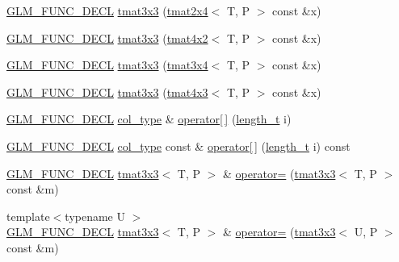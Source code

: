 \begin{DoxyCompactItemize}
\item 
\hyperlink{setup_8hpp_ab2d052de21a70539923e9bcbf6e83a51}{G\+L\+M\+\_\+\+F\+U\+N\+C\+\_\+\+D\+E\+CL} \hyperlink{structglm_1_1detail_1_1tmat3x3_a98fab3111797488d43d13de3b9c34db9}{tmat3x3} (\hyperlink{structglm_1_1detail_1_1tmat2x4}{tmat2x4}$<$ T, P $>$ const \&x)
\item 
\hyperlink{setup_8hpp_ab2d052de21a70539923e9bcbf6e83a51}{G\+L\+M\+\_\+\+F\+U\+N\+C\+\_\+\+D\+E\+CL} \hyperlink{structglm_1_1detail_1_1tmat3x3_a727ffba03de5a02331f41858742f8d09}{tmat3x3} (\hyperlink{structglm_1_1detail_1_1tmat4x2}{tmat4x2}$<$ T, P $>$ const \&x)
\item 
\hyperlink{setup_8hpp_ab2d052de21a70539923e9bcbf6e83a51}{G\+L\+M\+\_\+\+F\+U\+N\+C\+\_\+\+D\+E\+CL} \hyperlink{structglm_1_1detail_1_1tmat3x3_a3c9ff04e39cb4cd6d0b4710683d7ab8c}{tmat3x3} (\hyperlink{structglm_1_1detail_1_1tmat3x4}{tmat3x4}$<$ T, P $>$ const \&x)
\item 
\hyperlink{setup_8hpp_ab2d052de21a70539923e9bcbf6e83a51}{G\+L\+M\+\_\+\+F\+U\+N\+C\+\_\+\+D\+E\+CL} \hyperlink{structglm_1_1detail_1_1tmat3x3_a3c3870ea513e58b0a44ca5e6abedcc71}{tmat3x3} (\hyperlink{structglm_1_1detail_1_1tmat4x3}{tmat4x3}$<$ T, P $>$ const \&x)
\item 
\hyperlink{setup_8hpp_ab2d052de21a70539923e9bcbf6e83a51}{G\+L\+M\+\_\+\+F\+U\+N\+C\+\_\+\+D\+E\+CL} \hyperlink{structglm_1_1detail_1_1tmat3x3_ad47f3a11bd4333d1103bfa93a86fa54f}{col\+\_\+type} \& \hyperlink{structglm_1_1detail_1_1tmat3x3_ac99796f89cd590265d02f98850605043}{operator\mbox{[}$\,$\mbox{]}} (\hyperlink{namespaceglm_a090a0de2260835bee80e71a702492ed9}{length\+\_\+t} i)
\item 
\hyperlink{setup_8hpp_ab2d052de21a70539923e9bcbf6e83a51}{G\+L\+M\+\_\+\+F\+U\+N\+C\+\_\+\+D\+E\+CL} \hyperlink{structglm_1_1detail_1_1tmat3x3_ad47f3a11bd4333d1103bfa93a86fa54f}{col\+\_\+type} const  \& \hyperlink{structglm_1_1detail_1_1tmat3x3_a6f7965e71a4572bcd50a98f6b91e396b}{operator\mbox{[}$\,$\mbox{]}} (\hyperlink{namespaceglm_a090a0de2260835bee80e71a702492ed9}{length\+\_\+t} i) const
\item 
\hyperlink{setup_8hpp_ab2d052de21a70539923e9bcbf6e83a51}{G\+L\+M\+\_\+\+F\+U\+N\+C\+\_\+\+D\+E\+CL} \hyperlink{structglm_1_1detail_1_1tmat3x3}{tmat3x3}$<$ T, P $>$ \& \hyperlink{structglm_1_1detail_1_1tmat3x3_a7b73504291487e21519005578c6a900b}{operator=} (\hyperlink{structglm_1_1detail_1_1tmat3x3}{tmat3x3}$<$ T, P $>$ const \&m)
\item 
{\footnotesize template$<$typename U $>$ }\\\hyperlink{setup_8hpp_ab2d052de21a70539923e9bcbf6e83a51}{G\+L\+M\+\_\+\+F\+U\+N\+C\+\_\+\+D\+E\+CL} \hyperlink{structglm_1_1detail_1_1tmat3x3}{tmat3x3}$<$ T, P $>$ \& \hyperlink{structglm_1_1detail_1_1tmat3x3_a0b69c604eee9037a4b3ad45290e8d2ed}{operator=} (\hyperlink{structglm_1_1detail_1_1tmat3x3}{tmat3x3}$<$ U, P $>$ const \&m)

\end{DoxyCompactItemize}
